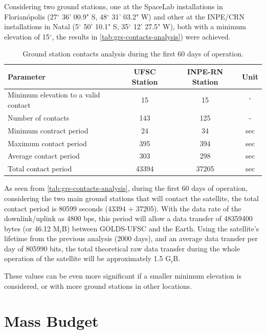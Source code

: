 Considering two ground stations, one at the SpaceLab installations in Florianópolis (27$^{\circ}$ 36' 00.9" S, 48$^{\circ}$ 31' 03.2" W) and other at the INPE/CRN installations in Natal (5$^{\circ}$ 50' 10.1" S, 35$^{\circ}$ 12' 27.5" W), both with a minimum elevation of 15$^{\circ}$, the results in \autoref{tab:grs-contacts-analysis}) were achieved. %

\begin{table}[!h]
    \centering
    \begin{tabular}{lccc}
        \toprule[1.5pt]
        \textbf{Parameter} & \textbf{UFSC Station} & \textbf{INPE-RN Station} & \textbf{Unit} \\
        \midrule
        Minimum elevation to a valid contact    & 15    & 15    & $^{\circ}$ \\
        Number of contacts                      & 143   & 125   & - \\
        Minimum contract period                  & 24    & 34    & sec \\
        Maximum contact period                  & 395   & 394   & sec \\
        Average contact period                  & 303   & 298   & sec \\
        Total contact period                    & 43394 & 37205 & sec \\
        \bottomrule[1.5pt]
    \end{tabular}
    \caption{Ground station contacts analysis during the first 60 days of operation.}
    \label{tab:grs-contacts-analysis}
\end{table}

As seen from \autoref{tab:grs-contacts-analysis}, during the first 60 days of operation, considering the two main ground stations that will contact the satellite, the total contact period is 80599 seconds (43394 + 37205). With the data rate of the downlink/uplink as 4800 bps, this period will allow a data transfer of 48359400 bytes (or 46.12 M$_{i}$B) between GOLDS-UFSC and the Earth. Using the satellite's lifetime from the previous analysis (2000 days), and an average data transfer per day of 805990 bits, the total theoretical raw data transfer during the whole operation of the satellite will be approximately 1.5 G$_{i}$B.

These values can be even more significant if a smaller minimum elevation is considered, or with more ground stations in other locations.

\section{Mass Budget} \label{mass-budget}

